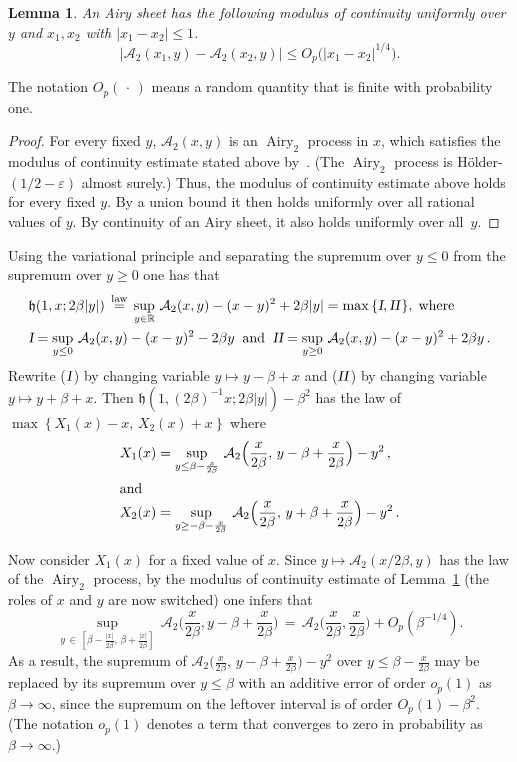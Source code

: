 \documentclass[10pt]{amsart}
\newtheorem{lemm}[theo]{Lemma}\newtheorem{prop}[theo]{Proposition}\newtheorem{coro}[theo]{Corollary}\newtheorem{conj}[theo]{Conjecture}
\theoremstyle{definition}\newtheorem{defi}[theo]{Definition}\newtheorem{rema}[theo]{Remark}\newtheorem{exam}[theo]{Example}\newtheorem{exem}[theo]{Example}\newtheorem{nota}[theo]{Notation}
\newcommand*{\I}{\textsl{I}}
\newcommand*{\II}{\textsl{II}} %
\DeclareMathOperator{\airy}{Airy}
\newcommand{\eps}{\varepsilon}
\newcommand{\R}{\mathbb{R}}
\newcommand{\A}{\mathcal{A}}
\newcommand{\h}{\mathfrak{h}}
\newcommand*{\MK}{\mkern 2mu}
\begin{document}
\begin{lemm} \label{lem:continuity}
An Airy sheet has the following modulus of continuity uniformly over $y$ and $x_1, x_2$ with $|x_1-x_2| \leq 1$.
\[
\big | \A_2(x_1,y) - \A_2(x_2,y) \big | \leq O_p\big(|x_1-x_2|^{1/4}\big).
\]
\end{lemm}
The notation $O_p({\,\cdot\,})$ means a random quantity that is finite with probability one.

\begin{proof}
For every fixed $y$, $\A_2(x,y)$ is an $\airy_2$ process in $x$, which satisfies the modulus of continuity estimate stated above by~\cite[Theorem~4.4]{MQR}. (The $\airy_2$ process is H\"older-$(1/2 - \eps)$ almost surely.) Thus, the modulus of continuity estimate above holds for every fixed $y$. By a union bound it then holds uniformly over all rational values of $y$. By continuity of an Airy sheet, it also holds uniformly over all~$y$.
\end{proof}

Using the variational principle and separating the supremum over $y \leq 0$ from the supremum over $y \geq 0$ one has that
\begin{align*}
& \h(1,x; 2\beta|y|) \,\overset{\text{law}}{=} \,\sup_{y \in \R}\, \A_2(x,y) - (x-y)^2 + 2\beta|y| = \max\, \{ \I, \II\MK \}, \;\text{where}\\
& \I = \sup_{y \leq 0}\, \A_2(x,y) - (x-y)^2 - 2\beta y \;\;\text{and}\;\; \II = \sup_{y \geq 0}\, \A_2(x,y) - (x-y)^2 + 2\beta y \,.
\end{align*}
Rewrite ($\I\MK$) by changing variable $y \mapsto y - \beta + x$ and ($\II\MK$) by changing variable $y \mapsto y + \beta +x$. Then $\h(1, (2 \beta)^{-1} x; 2\beta |y|) - \beta^2 $ has the law of $\max \left \{ X_1(x) - x, \, X_2(x) + x \right \}$ where
\begin{align*}
X_1(x) &= \sup_{y \leq \beta -\frac{x}{2\beta}}\, \A_2 \Big(\frac{x}{2\beta}, \, y-\beta+\frac{x}{2\beta}\Big) -y^2 \,,\\
\intertext{and}
X_2(x) &= \sup_{y \geq -\beta -\frac{x}{2\beta}}\, \A_2 \Big(\frac{x}{2\beta}, \, y+\beta+\frac{x}{2\beta}\Big) -y^2 \,.
\end{align*}

Now consider $X_1(x)$ for a fixed value of $x$. Since $y \mapsto \A_2(x/2\beta, y)$ has the law of the $\airy_2$ process, by the modulus of continuity estimate of Lemma~\ref{lem:continuity} (the roles of $x$ and $y$ are now switched) one infers that
\[
\sup_{y \, \in \, \left [\beta - \frac{|x|}{2\beta}, \, \beta + \frac{|x|}{2\beta} \right]}\, \A_2\Big(\frac{x}{2\beta}, y-\beta+\frac{x}{2\beta}\Big)\,
= \, \A_2\Big(\frac{x}{2\beta}, \frac{x}{2\beta}\Big) + O_p(\beta^{-1/4}).
\]
As a result, the supremum of $\A_2 \Big(\frac{x}{2\beta}, \, y-\beta+\frac{x}{2\beta}\Big) -y^2$ over $y \leq \beta -\frac{x}{2\beta}$ may be replaced by its supremum over $y \leq \beta$ with an additive error of order $o_p(1)$ as $\beta \to \infty$, since the supremum on the leftover interval is of order $O_p(1) - \beta^2$. (The notation $o_p(1)$ denotes a term that converges to zero in probability as $\beta \to \infty$.)
\end{document}
